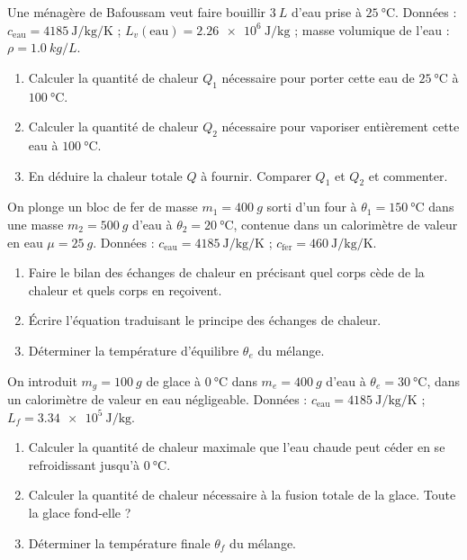 \documentclass[11pt]{article}
\newcounter{popsec}
\newcounter{popsub}
\newcommand{\courssub}[1]{%
  \stepcounter{popsub}%
  \par\vspace{9pt}\noindent{\popxbold\fontsize{11.5}{13}\selectfont\color{popink}{\color{poporange}\thepopsec.\thepopsub}\hspace{6pt}#1}\par\nopagebreak\vspace{4pt}
}
\begin{document}
\courssub{Je m'entraîne}

\begin{exercice}
Une ménagère de Bafoussam veut faire bouillir $\SI{3}{L}$ d'eau prise à $\SI{25}{\celsius}$.
Données : $c_{\text{eau}} = \SI{4185}{\joule\per\kilogram\per\kelvin}$ ; $L_v(\text{eau}) = \SI{2,26e6}{\joule\per\kilogram}$ ; masse volumique de l'eau : $\rho = \SI{1,0}{kg/L}$.
\begin{enumerate}
\item Calculer la quantité de chaleur $Q_1$ nécessaire pour porter cette eau de $\SI{25}{\celsius}$ à $\SI{100}{\celsius}$.
\item Calculer la quantité de chaleur $Q_2$ nécessaire pour vaporiser entièrement cette eau à $\SI{100}{\celsius}$.
\item En déduire la chaleur totale $Q$ à fournir. Comparer $Q_1$ et $Q_2$ et commenter.
\end{enumerate}
\end{exercice}

\begin{exercice}
On plonge un bloc de fer de masse $m_1 = \SI{400}{g}$ sorti d'un four à $\theta_1 = \SI{150}{\celsius}$ dans une masse $m_2 = \SI{500}{g}$ d'eau à $\theta_2 = \SI{20}{\celsius}$, contenue dans un calorimètre de valeur en eau $\mu = \SI{25}{g}$.
Données : $c_{\text{eau}} = \SI{4185}{\joule\per\kilogram\per\kelvin}$ ; $c_{\text{fer}} = \SI{460}{\joule\per\kilogram\per\kelvin}$.
\begin{enumerate}
\item Faire le bilan des échanges de chaleur en précisant quel corps cède de la chaleur et quels corps en reçoivent.
\item Écrire l'équation traduisant le principe des échanges de chaleur.
\item Déterminer la température d'équilibre $\theta_e$ du mélange.
\end{enumerate}
\end{exercice}

\begin{exercice}
On introduit $m_g = \SI{100}{g}$ de glace à $\SI{0}{\celsius}$ dans $m_e = \SI{400}{g}$ d'eau à $\theta_e = \SI{30}{\celsius}$, dans un calorimètre de valeur en eau négligeable.
Données : $c_{\text{eau}} = \SI{4185}{\joule\per\kilogram\per\kelvin}$ ; $L_f = \SI{3,34e5}{\joule\per\kilogram}$.
\begin{enumerate}
\item Calculer la quantité de chaleur maximale que l'eau chaude peut céder en se refroidissant jusqu'à $\SI{0}{\celsius}$.
\item Calculer la quantité de chaleur nécessaire à la fusion totale de la glace. Toute la glace fond-elle ?
\item Déterminer la température finale $\theta_f$ du mélange.
\end{enumerate}
\end{exercice}
\end{document}
